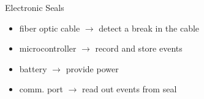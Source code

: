 \documentclass{beamer}
\begin{document}
\begin{frame}[t]{Electronic Seals}
{\begin{minipage}{0.49 \textwidth}
        \end{minipage}
        \begin{minipage}{0.49 \textwidth}
        
            \begin{itemize}
                \item fiber optic cable $\rightarrow$ detect a break in the cable
                \item microcontroller $\rightarrow$ record and store events
                \item battery $\rightarrow$ provide power
                \item comm. port $\rightarrow$ read out events from seal
            \end{itemize}
            
        \end{minipage}
      }
      
    
        
    \end{frame}
    
\end{document}
